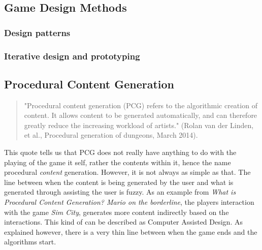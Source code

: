 \subsection{Game Design Methods}
\subsubsection{Design patterns}
\subsubsection{Iterative design and prototyping}


\subsection{Procedural Content Generation}
\begin{quotation}
"Procedural content generation (PCG) refers to the algorithmic creation of content. It allows content to be generated automatically, and can therefore greatly reduce the increasing workload of artists." (Rolan van der Linden, et al., Procedural generation of dungeons, March 2014). \cite{art:pcg}
\end{quotation}
This quote tells us that PCG does not really have anything to do with the playing of the game it self, rather the contents within it, hence the name procedural \textit{content} generation. 
However, it is not always as simple as that. The line between when the content is being generated by the user and what is generated through assisting the user is fuzzy.
As an example from \textit{What is Procedural Content Generation? Mario on the borderline}\cite{art:whatpcg}, the players interaction with the game \textit{Sim City}, generates more content indirectly based on the interactions. This kind of can be described as Computer Assisted Design. As explained however, there is a very thin line between when the game ends and the algorithms start. 

